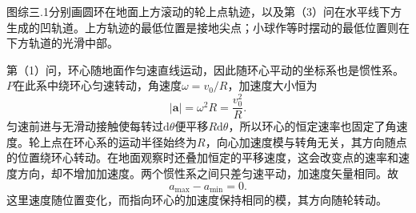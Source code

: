 \documentclass[UTF8,fontset=fandol,a4paper,11pt]{ctexart}
\begin{document}
图综三.1分别画圆环在地面上方滚动的轮上点轨迹，以及第（3）问在水平线下方生成的凹轨道。上方轨迹的最低位置是接地尖点；小球作等时摆动的最低位置则在下方轨道的光滑中部。

第（1）问，环心随地面作匀速直线运动，因此随环心平动的坐标系也是惯性系。$P$在此系中绕环心匀速转动，角速度$\omega=v_0/R$，加速度大小恒为
\[
|\boldsymbol a|=\omega^2R=\frac{v_0^2}{R}.
\]
匀速前进与无滑动接触使每转过$\mathrm d\theta$便平移$R\mathrm d\theta$，所以环心的恒定速率也固定了角速度。轮上点在环心系的运动半径始终为$R$，向心加速度模与转角无关，其方向随点的位置绕环心转动。在地面观察时还叠加恒定的平移速度，这会改变点的速率和速度方向，却不增加加速度。两个惯性系之间只差匀速平动，加速度矢量相同。故
\[
\boxed{a_{\max}-a_{\min}=0}.
\]
这里速度随位置变化，而指向环心的加速度保持相同的模，其方向随轮转动。
\begin{center}\begin{minipage}{.98\linewidth}\centering
\begin{tikzpicture}[scale=.8,transform shape]

\end{tikzpicture}
\end{minipage}
\end{center}
\end{document}
